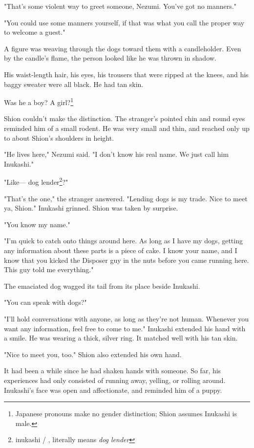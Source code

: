 "That's some violent way to greet someone, Nezumi. You've got no
manners."

"You could use some manners yourself, if that was what you call the
proper way to welcome a guest."

A figure was weaving through the dogs toward them with a candleholder.
Even by the candle's flame, the person looked like he was thrown in
shadow.

His waist-length hair, his eyes, his trousers that were ripped at the
knees, and his baggy sweater were all black. He had tan skin.

Was he a boy? A girl?\footnote{Japanese pronouns make no gender distinction; Shion assumes Inukashi is male.}

Shion couldn't make the distinction. The stranger's pointed chin and
round eyes reminded him of a small rodent. He was very small and thin,
and reached only up to about Shion's shoulders in height.

"He lives here," Nezumi said. "I don't know his real name. We just call
him Inukashi."

"Like--- dog lender\footnote{inukashi / , literally means \emph{dog lender}}?"

"That's the one," the stranger answered. "Lending dogs is my trade. Nice
to meet ya, Shion." Inukashi grinned. Shion was taken by surprise.

"You know my name."

"I'm quick to catch onto things around here. As long as I have my dogs,
getting any information about these parts is a piece of cake. I know
your name, and I know that you kicked the Disposer guy in the nuts
before you came running here. This guy told me everything."

The emaciated dog wagged its tail from its place beside Inukashi.

"You can speak with dogs?"

"I'll hold conversations with anyone, as long as they're not human.
Whenever you want any information, feel free to come to me." Inukashi
extended his hand with a smile. He was wearing a thick, silver ring. It
matched well with his tan skin.

"Nice to meet you, too." Shion also extended his own hand.

It had been a while since he had shaken hands with someone. So far, his
experiences had only consisted of running away, yelling, or rolling
around. Inukashi's face was open and affectionate, and reminded him of a
puppy.


